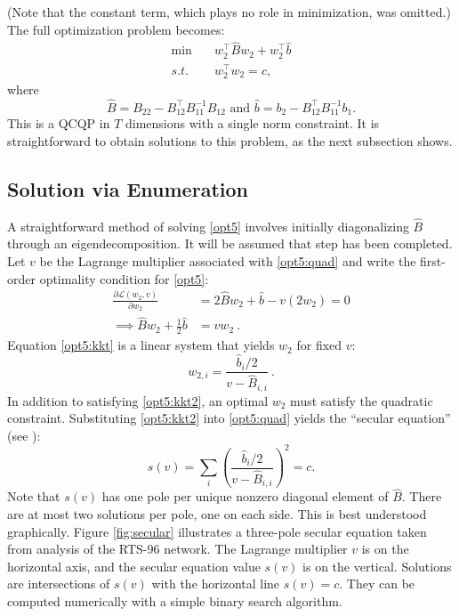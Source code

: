 \documentclass[journal,twoside]{IEEEtran}
\begin{document}
(Note that the constant term, which plays no role in minimization, was
omitted.) The full optimization problem becomes:
\begin{subequations}\label{opt5}
\begin{align}
\min\quad & w_2^\top \hat{B}w_2 + w_2^\top \hat{b} \\
\label{opt5:quad} s.t.\quad & w_2^\top w_2 = c,
\end{align}
\end{subequations}
where
\[
\hat{B} = B_{22} - B_{12}^\top B_{11}^{-1}B_{12} \text{ and }\hat{b} = b_2 - B_{12}^\top B_{11}^{-1}b_1.
\]
This is a QCQP in $T$ dimensions with a single norm constraint. It is
straightforward to obtain solutions to this problem, as the next
subsection shows.

\subsection{Solution via Enumeration}\label{sec:solution-enumeration}
A straightforward method of solving \eqref{opt5} involves initially
diagonalizing $\hat{B}$ through an eigendecomposition. It will be
assumed that step has been completed. Let $v$ be the Lagrange multiplier associated with \eqref{opt5:quad} and write the first-order optimality condition for \eqref{opt5}:
\begin{align}
\nonumber \frac{\partial \mathcal{L}(w_2,v)}{\partial w_2} &= 2\hat{B}w_2 + \hat{b} - v(2w_2) = 0 \\
\label{opt5:kkt} \implies \hat{B}w_2 + \frac{1}{2}\hat{b} &= vw_2~.
\end{align}
Equation \eqref{opt5:kkt} is a linear system that yields $w_2$ for fixed $v$:
\begin{equation}
\label{opt5:kkt2}w_{2,i} = \frac{\hat{b}_i/2}{v - \hat{B}_{i,i}}~.
\end{equation}
In addition to satisfying \eqref{opt5:kkt2}, an optimal $w_2$ must
satisfy the quadratic constraint. Substituting \eqref{opt5:kkt2} into
\eqref{opt5:quad} yields the ``secular equation'' (see
\cite{bienstock2014}):
\begin{equation}
s(v) = \sum_{i}\left( \frac{\hat{b}_i /2}{v - \hat{B}_{i,i}}\right)^2 = c.
\end{equation}
Note that $s(v)$ has one pole per unique nonzero diagonal element of
$\hat{B}$. There are at most two solutions per pole, one on each
side. This is best understood graphically. Figure \ref{fig:secular}
illustrates a three-pole secular equation taken from analysis of the
RTS-96 network. The Lagrange multiplier $v$ is on the horizontal axis,
and the secular equation value $s(v)$ is on the vertical. Solutions
are intersections of $s(v)$ with the horizontal line $s(v)=c$. They
can be computed numerically with a simple binary search algorithm.
\end{document}
